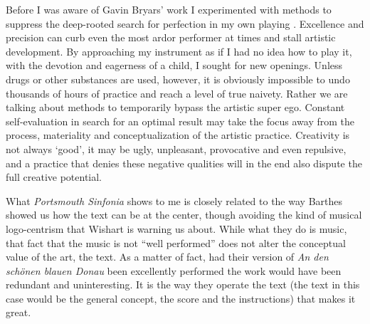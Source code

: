 \documentclass[11pt]{article}
\begin{document}
Before I was aware of Gavin Bryars' work I experimented with methods to suppress the deep-rooted search for perfection in my own playing \citep[][]{frisk2013}. Excellence and precision can curb even the most ardor performer at times and stall artistic development. By approaching my instrument as if I had no idea how to play it, with the devotion and eagerness of a child, I sought for new openings. Unless drugs or other substances are used, however, it is obviously impossible to undo thousands of hours of practice and reach a level of true naivety. Rather we are talking about methods to temporarily bypass the artistic super ego. Constant self-evaluation in search for an optimal result may take the focus away from the process, materiality and conceptualization of the artistic practice. Creativity is not always `good', it may be ugly, unpleasant, provocative and even repulsive, and a practice that denies these negative qualities will in the end also dispute the full creative potential.


What \emph{Portsmouth Sinfonia} shows to me is closely related to the way Barthes showed us how the text can be at the center, though avoiding the kind of musical logo-centrism that Wishart is warning us about. While what they do is music, that fact that the music is not ``well performed'' does not alter the conceptual value of the art, the text. As a matter of fact, had their version of \emph{An den schönen blauen Donau} been excellently performed the work would have been redundant and uninteresting. It is the way they operate the text (the text in this case would be the general concept, the score and the instructions) that makes it great.
\end{document}

